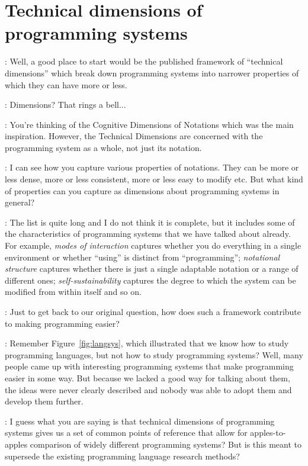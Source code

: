 \documentclass[runningheads]{llncs}
\newcommand{\T}{Tomas}
\newcommand{\J}{Joel}
\newcommand{\says}[2][gg]{\vspace{0.5em}\noindent\hangindent=0.5cm{\textsc{#1}}: #2}
\begin{document}
\section{Technical dimensions of programming systems}

\says[\J]{Well, a good place to start would be the published framework of ``technical dimensions''
\cite{jakubovic-2023-techdims} which break down programming systems into narrower properties of which they can have more or less.}

\says[\T]{Dimensions? That rings a bell...}

\says[\J]{You're thinking of the Cognitive Dimensions of Notations \cite{green-1990-cogdims} which was the main inspiration. However, the Technical Dimensions are concerned with the programming system as a whole, not just its notation.}

\says[\T]{I can see how you capture various properties of notations. They can be more or less
  dense, more or less consistent, more or less easy to modify etc. But what kind of properties
  can you capture as dimensions about programming systems in general?}

\says[\J]{The list is quite long and I do not think it is complete, but it includes some of the
  characteristics of programming systems that we have talked about already. For example,
  \emph{modes of interaction} captures whether you do everything in a single environment or
  whether ``using'' is distinct from ``programming''; \emph{notational structure} captures whether
  there is just a single adaptable notation or a range of different ones; \emph{self-sustainability}
  captures the degree to which the system can be modified from within itself and so on.}

\says[\T]{Just to get back to our original question, how does such a framework contribute to making programming easier?}

\says[\J]{Remember Figure~\ref{fig:langsys}, which illustrated that we know how to study programming languages, but not how to study programming systems? Well, many people came up with interesting programming systems that make programming easier in some way. But because we lacked a good way for talking about them, the ideas were never clearly described and nobody was able to adopt them and develop them further.}

\says[\T]{I guess what you are saying is that technical dimensions of programming systems gives us a set of common points of reference that allow for apples-to-apples comparison of widely different programming systems? But is this meant to supersede the existing programming language research methods?}
\end{document}
